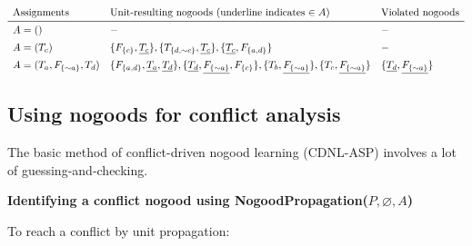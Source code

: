 \documentclass[9pt,a4paper,landscape]{article}
\newcommand{\ngtb}[1]{T_{ \{#1\} }}
\newcommand{\ngfb}[1]{F_{ \{#1\} }}
\newcommand{\ngta}[1]{T_{#1}}
\begin{document}
{\begin{center}
	$\begin{array}{lll}
	\text{Assignments} & \text{Unit-resulting nogoods (underline indicates $\in A$)} & \text{Violated nogoods}\\ \midrule
	A = () & - & - \\[.5em]
	A = (\ngta{c}) & \{\ngfb{c}, \underline{\ngta{c}}\}, \{\ngtb{d, \sim c}, \underline{\ngta{c}}\}, \{\underline{\ngta{c}}, \ngfb{a, d}\} & -\\[.5em]
	A = (\ngta{a}, \ngfb{\sim a}, \ngta{d}) & \{\ngfb{a, d}, \underline{\ngta{a}}, \underline{\ngta{d}}\}, \{\underline{\ngta{d}}, \underline{\ngfb{\sim a}}, \ngfb{c}\}, \{\ngta{b}, \underline{\ngfb{\sim a}}\}, \{\ngta{c}, \underline{\ngfb{\sim a}}\} & \{\underline{\ngta{d}}, \underline{\ngfb{\sim a}}\} \\
\end{array}$
\end{center}


\subsection{Using nogoods for conflict analysis}
\label{subsec:ng-confl}

The basic method of conflict-driven nogood learning (CDNL-ASP) involves a lot of guessing-and-checking.

\vspace{\baselineskip}
\textbf{Identifying a conflict nogood using NogoodPropagation($P, \varnothing, A$)}

To reach a conflict by unit propagation:

}
\end{document}
